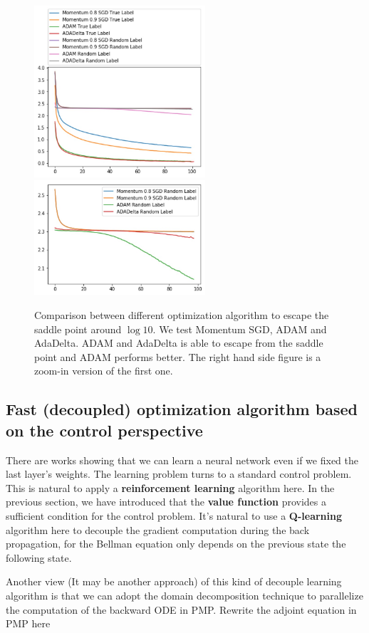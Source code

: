 \documentclass{article}
\theoremstyle{plain}
\theoremstyle{definition}
\begin{document}
\begin{figure}[H]
    \centering
    \includegraphics[width=2.5in]{opt.jpg}
    \includegraphics[width=2.5in]{saddle.jpg}
    \caption{Comparison between different optimization algorithm to escape the saddle point around $\log 10$. We test Momentum SGD, ADAM and AdaDelta. ADAM and AdaDelta is able to escape from the saddle point and ADAM performs better. The right hand side figure is a zoom-in version of the first one.}
    \label{optsadd}
\end{figure}

\subsection{Fast (decoupled) optimization algorithm based on the control perspective}

There are works showing that we can learn a neural network even if we fixed the last layer's weights. The learning problem turns to a standard control problem. This is natural to apply a \textbf{reinforcement learning} algorithm here. In the previous section, we have introduced that the \textbf{value function} provides a sufficient condition for the control problem. It's natural to use a \textbf{Q-learning} algorithm here to decouple the gradient computation during the back propagation, for the Bellman equation only depends on the previous state the following state.


Another view (It may be another approach) of this kind of decouple learning algorithm is that we can adopt the domain decomposition technique to parallelize the computation of the backward ODE in PMP. Rewrite the adjoint equation in PMP here
\end{document}
